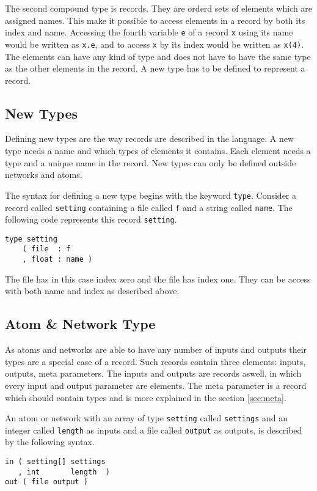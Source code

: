 The second compound type is records. They are orderd sets of elements
which are assigned names. This make it possible to access elements in
a record by both its index and name. Accessing the fourth variable
\verb#e# of a record \verb#x# using its name would be written as
\verb#x.e#, and to access \verb#x# by its index would be written as
\verb#x(4)#. The elements can have any kind of type and does not have
to have the same type as the other elements in the record. A new type
has to be defined to represent a record.

\subsection{New Types}
Defining new types are the way records are described in the
language. A new type needs a name and which types of elements it
contains. Each element needs a type and a unique name in the
record. New types can only be defined outside networks and atoms.

The syntax for defining a new type begins with the keyword
\verb#type#. Consider a record called \verb#setting# containing a file
called \verb#f# and a string called \verb#name#. The following code
represents this record \verb#setting#.

\begin{verbatim}
type setting
    ( file  : f
    , float : name )
\end{verbatim}

The file has in this case index zero and the file has index one. They
can be access with both name and index as described above.

\subsection{Atom \& Network Type}\label{sec:atomnet}
As atoms and networks are able to have any number of inputs and
outputs their types are a special case of a record. Such records
contain three elements: inputs, outputs, meta parameters. The inputs
and outputs are records aswell, in which every input and output
parameter are elements. The meta parameter is a record which should
contain types and is more explained in the section \autoref{sec:meta}.

An atom or network with an array of type \verb#setting# called
\verb#settings# and an integer called \verb#length# as inputs and a
file called \verb#output# as outputs, is described by the following
syntax.

\begin{verbatim}
in ( setting[] settings
   , int       length  )
out ( file output )
\end{verbatim}

